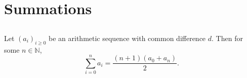 \documentclass{article}
\begin{document}

\tableofcontents

\section{Summations}%
\label{sec:summations}

\subsection{}%
\label{sub:sum-arithmetic-series}

Let $(a_i)_{i \geq 0}$ be an arithmetic sequence with common difference $d$.
  Then for some $n \in \mathbb{N}$,
  \begin{equation}
    \label{sub:sum-arithmetic-series-eq1}
    \sum_{i=0}^n a_i = \frac{(n + 1)(a_0 + a_n)}{2}.
  \end{equation}
\end{document}

